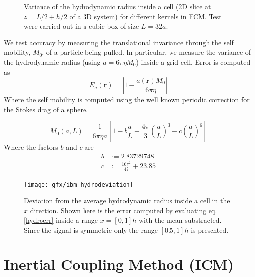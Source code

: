\documentclass[ twoside,openright,titlepage,numbers=noenddot,%
headinclude,footinclude,cleardoublepage=empty,abstract=on,
BCOR=5mm,paper=a4,fontsize=11pt, dvipsnames
]{scrreprt}
\renewcommand{\vec}[1]{\bm{#1}}
\begin{document}
\begin{figure}
  \caption{Variance of the hydrodynamic radius inside a cell (2D slice at $z=L/2+h/2$ of a 3D system) for different kernels in \gls{FCM}. Test were carried out in a cubic box of size $L=32a$.}
\end{figure}
We test accuracy by measuring the translational invariance through the self mobility, $M_0$, of a particle being pulled. In particular, we measure the variance of the hydrodynamic radius (using $a = 6\pi\eta M_{0}$) inside a grid cell.
Error is computed as
\begin{equation}
  \label{hydroerr}
  E_a(\vec{r}) = \left|1 - \frac{a(\vec{r})M_{0}}{6\pi\eta}\right|
\end{equation}
Where the self mobility is computed using the well known periodic correction for the Stokes drag of a sphere\cite{Hasimoto1959}.

\begin{equation}
  M_{0}(a,L) = \frac{1}{6\pi\eta a}\left[1-b\frac{a}{L} + \frac{4\pi}{3}\left(\frac{a}{L}\right)^3 - c \left(\frac{a}{L}\right)^6\right]
\end{equation}
Where the factors $b$ and $c$ are
\begin{equation}
  \begin{aligned}
  b &:= 2.83729748\\
  c &:= \frac{16\pi^2}{45} + 23.85
  \end{aligned}
\end{equation}
\begin{figure}
\label{fig:ibm_hydrovar}
\texttt{[image: gfx/ibm\_hydrodeviation]}  
  \caption{Deviation from the average hydrodynamic radius inside a cell in the $x$ direction. Shown here is the error computed by evaluating eq. \eqref{hydroerr} inside a range $x=[0, 1]h$ with the mean substracted. Since the signal is symmetric only the range $[0.5, 1]h$ is presented.}
\end{figure}


\section{Inertial Coupling Method (ICM)}
\end{document}
